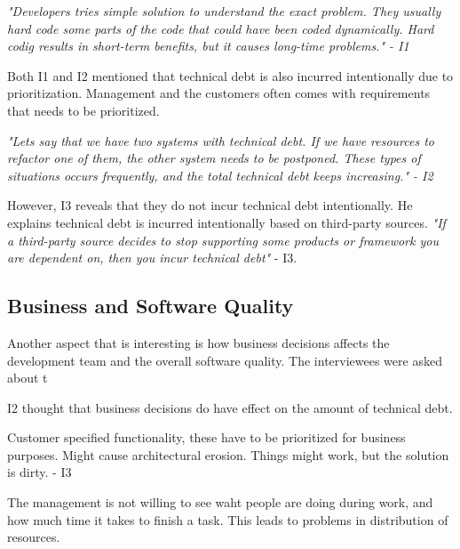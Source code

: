 \begin{displayquote}
	\textit{"Developers tries simple solution to understand the exact problem. They usually hard code some parts of the code that could have been coded dynamically. Hard codig results in short-term benefits, but it causes long-time problems." - I1}
\end{displayquote}

Both I1 and I2 mentioned that technical debt is also incurred intentionally due to prioritization. Management and the customers often comes with requirements that needs to be prioritized. 

\begin{displayquote}
	\textit{"Lets say that we have two systems with technical debt. If we have resources to refactor one of them, the other system needs to be postponed. These types of situations occurs frequently, and the total technical debt keeps increasing." - I2}
\end{displayquote}

However, I3 reveals that they do not incur technical debt intentionally. He explains technical debt is incurred intentionally based on third-party sources. \textit{"If a third-party source decides to stop supporting some products or framework you are dependent on, then you incur technical debt"} - I3. 




\subsection{Business and Software Quality}
Another aspect that is interesting is how business decisions affects the development team and the overall software quality. The interviewees were asked about t

I2 thought that business decisions do have effect on the amount of technical debt. 

\begin{displayquote}
Customer specified functionality, these have to be prioritized for business purposes. Might cause architectural erosion. Things might work, but the solution is dirty. - I3
\end{displayquote}

\begin{displayquote}
The management is not willing to see waht people are doing during work, and how much time it takes to finish a task. This leads to problems in distribution of resources.
\end{displayquote}


